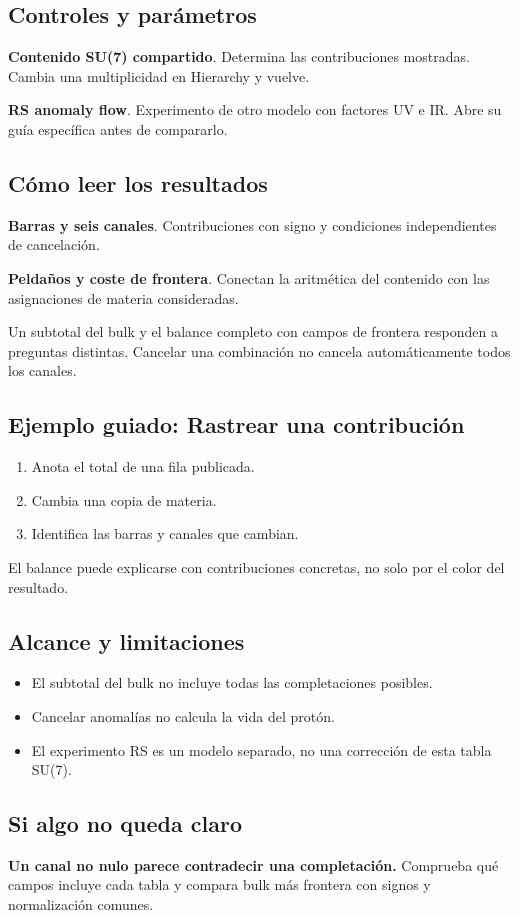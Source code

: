 \documentclass[11pt,a4paper]{article}
\begin{document}
\subsection*{Controles y parámetros}
\textbf{Contenido SU(7) compartido}. Determina las contribuciones mostradas. Cambia una multiplicidad en Hierarchy y vuelve.

\textbf{RS anomaly flow}. Experimento de otro modelo con factores UV e IR. Abre su guía específica antes de compararlo.

\subsection*{Cómo leer los resultados}
\textbf{Barras y seis canales}. Contribuciones con signo y condiciones independientes de cancelación.

\textbf{Peldaños y coste de frontera}. Conectan la aritmética del contenido con las asignaciones de materia consideradas.

Un subtotal del bulk y el balance completo con campos de frontera responden a preguntas distintas. Cancelar una combinación no cancela automáticamente todos los canales.
\subsection*{Ejemplo guiado: Rastrear una contribución}
\begin{enumerate}
\item Anota el total de una fila publicada.
\item Cambia una copia de materia.
\item Identifica las barras y canales que cambian.
\end{enumerate}
El balance puede explicarse con contribuciones concretas, no solo por el color del resultado.
\subsection*{Alcance y limitaciones}
\begin{itemize}
\item El subtotal del bulk no incluye todas las completaciones posibles.
\item Cancelar anomalías no calcula la vida del protón.
\item El experimento RS es un modelo separado, no una corrección de esta tabla SU(7).
\end{itemize}
\subsection*{Si algo no queda claro}
\textbf{Un canal no nulo parece contradecir una completación.} Comprueba qué campos incluye cada tabla y compara bulk más frontera con signos y normalización comunes.
\end{document}
